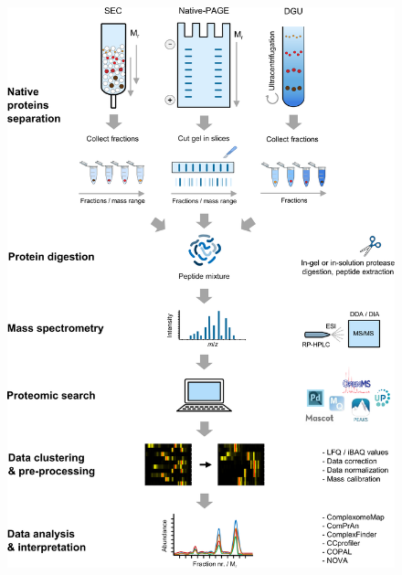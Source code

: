 \begin{figure}[hb!]
    \center
    \includegraphics[width=0.9 \textwidth]{Chapter.1/Figures/Figure5.png}
    \caption{}
    \label{fig:fig5}
\end{figure}
\addtocounter{figure}{-1}
